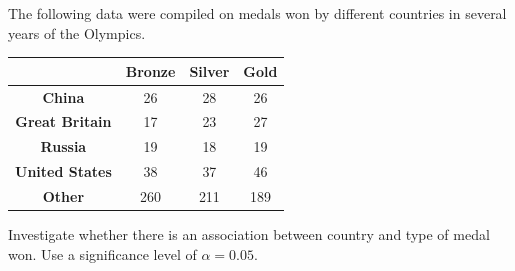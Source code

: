 \documentclass[noanswers]{exam}
\begin{document}
\begin{questions}
\begin{parts}
\begin{solution}[\stretch{1}]
\vspace{3mm}

\end{solution}

\end{parts}

\newpage

\question The following data were compiled on medals won by different countries in several years of the Olympics. 

\begin{center}
\begin{tabular}{|c|c|c|c|}
\hline
 & \textbf{Bronze} & \textbf{Silver} & \textbf{Gold}\\
 \hline
 \textbf{China} & 26 & 28 & 26 \\
 \hline
 \textbf{Great Britain} & 17 & 23 & 27 \\
 \hline
 \textbf{Russia} & 19 & 18 & 19 \\
 \hline
 \textbf{United States} & 38 & 37 & 46 \\
 \hline
 \textbf{Other} & 260 & 211 & 189 \\
 \hline 
\end{tabular}
\end{center}

Investigate whether there is an association between country and type of medal won. Use a significance level of $\alpha=0.05$.

\vspace{2mm}


\end{questions}
\end{document}

